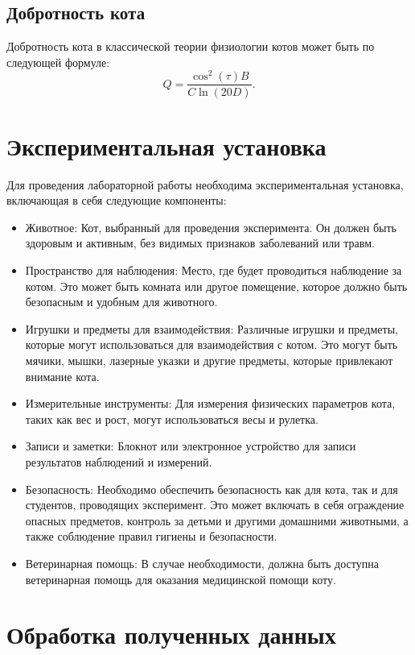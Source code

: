 \documentclass[12pt,a4paper]{article}
\begin{document}
\subsection{Добротность кота}
Добротность кота в классической теории физиологии котов может быть по следующей формуле:
\begin{equation}\label{cat_quality}
Q = \frac{\cos^2(\tau)B}{C\ln(20D)}.
\end{equation}

\section{Экспериментальная установка}
Для проведения лабораторной работы необходима экспериментальная установка, включающая в себя следующие компоненты:
\begin{itemize}
    \item Животное: Кот, выбранный для проведения эксперимента. Он должен быть здоровым и активным, без видимых признаков заболеваний или травм.
    \item Пространство для наблюдения: Место, где будет проводиться наблюдение за котом. Это может быть комната или другое помещение, которое должно быть безопасным и удобным для животного.
    \item Игрушки и предметы для взаимодействия: Различные игрушки и предметы, которые могут использоваться для взаимодействия с котом. Это могут быть мячики, мышки, лазерные указки и другие предметы, которые привлекают внимание кота.
    \item Измерительные инструменты: Для измерения физических параметров кота, таких как вес и рост, могут использоваться весы и рулетка.
    \item Записи и заметки: Блокнот или электронное устройство для записи результатов наблюдений и измерений.
    \item Безопасность: Необходимо обеспечить безопасность как для кота, так и для студентов, проводящих эксперимент. Это может включать в себя ограждение опасных предметов, контроль за детьми и другими домашними животными, а также соблюдение правил гигиены и безопасности.
    \item Ветеринарная помощь: В случае необходимости, должна быть доступна ветеринарная помощь для оказания медицинской помощи коту.
    \end{itemize}


\section{Обработка полученных данных}
\end{document}
